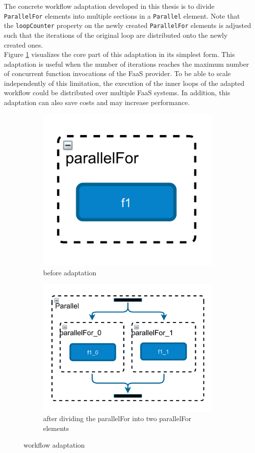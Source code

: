 \documentclass[a4paper,top=25mm,bottom=25mm,12pt,pdftex,halfparskip,twoside,bibtotoc,numbers=noenddot]{scrbook}
\begin{document}
The concrete workflow adaptation developed in this thesis is to divide \texttt{ParallelFor} elements into multiple sections in a \texttt{Parallel} element.
Note that the \texttt{loopCounter} property on the newly created \texttt{ParallelFor} elements is adjusted such that the iterations of the original loop are distributed onto the newly created ones.\\
Figure \ref{fig:workflow-adaptation} visualizes the core part of this adaptation in its simplest form.
This adaptation is useful when the number of iterations reaches the maximum number of concurrent function invocations of the FaaS provider. To be able to scale independently of this limitation, the execution of the inner loops of the adapted workflow could be distributed over multiple FaaS systems. In addition, this adaptation can also save costs and may increase performance.

\begin{figure}[H]
\centering
\begin{subfigure}{.28\textwidth}
  \centering
  \includegraphics[width=.8\linewidth]{adaptation-before}
  \caption{before adaptation}
\end{subfigure}
\begin{subfigure}{.54\textwidth}
  \centering
  \includegraphics[width=.8\linewidth]{adaptation-after}
  \caption{after dividing the parallelFor into two parallelFor elements}
\end{subfigure}
\caption{workflow adaptation}
\label{fig:workflow-adaptation}
\end{figure}
\end{document}
